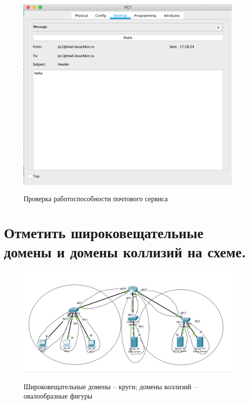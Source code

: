 \documentclass[a4paper,12pt]{article}
\begin{document}
	\begin{figure}[h!]
		\begin{center}
			{\includegraphics[scale = 0.45]{14.png}}
			\label{ris:14}
		\end{center}
		\caption{Проверка работоспособности почтового сервиса}
	\end{figure}
	
	\section{Отметить широковещательные домены и домены коллизий на схеме.}
	
	\begin{figure}[h!]
		\begin{center}
			{\includegraphics[scale = 0.5]{15.png}}
			\label{ris:15}
		\end{center}
		\caption{Широковещательные домены – круги; домены
			коллизий – овалообразные фигуры}
	\end{figure}
	
\end{document}
